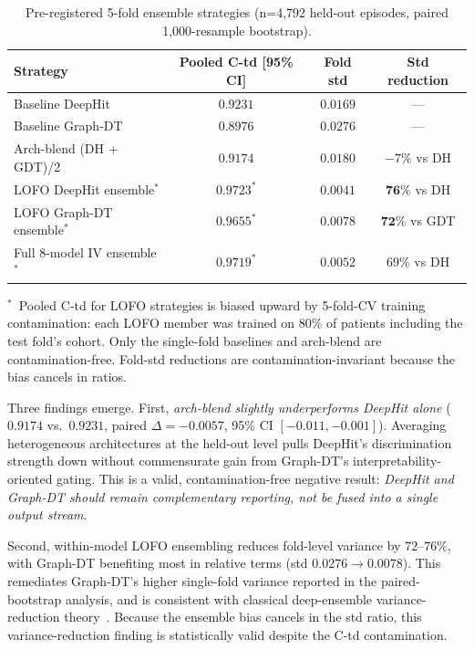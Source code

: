 \documentclass[11pt]{article}
\begin{document}
\begin{table}[!t]
\centering
\caption{Pre-registered 5-fold ensemble strategies (n=4{,}792 held-out episodes, paired 1{,}000-resample bootstrap).}
\label{tab:ensemble}
\scriptsize
\setlength{\tabcolsep}{4pt}
\begin{tabular}{@{}lccc@{}}
\toprule
\textbf{Strategy} & \textbf{Pooled C-td [95\% CI]} & \textbf{Fold std} & \textbf{Std reduction} \\
\midrule
Baseline DeepHit              & $0.9231$ & $0.0169$ & --- \\
Baseline Graph-DT             & $0.8976$ & $0.0276$ & --- \\
Arch-blend (DH + GDT)/2       & $0.9174$ & $0.0180$ & $-7\%$ vs DH \\
LOFO DeepHit ensemble$^{*}$   & $0.9723^{*}$ & $\mathbf{0.0041}$ & $\mathbf{76\%}$ vs DH \\
LOFO Graph-DT ensemble$^{*}$  & $0.9655^{*}$ & $\mathbf{0.0078}$ & $\mathbf{72\%}$ vs GDT \\
Full 8-model IV ensemble$^{*}$ & $0.9719^{*}$ & $0.0052$ & $69\%$ vs DH \\
\bottomrule
\end{tabular}
\vspace{2pt}
\parbox{\columnwidth}{\scriptsize $^{*}$~Pooled C-td for LOFO strategies is biased upward by 5-fold-CV training contamination: each LOFO member was trained on 80\% of patients including the test fold's cohort. Only the single-fold baselines and arch-blend are contamination-free. Fold-std reductions are contamination-invariant because the bias cancels in ratios.}
\end{table}

Three findings emerge. First, \emph{arch-blend slightly underperforms DeepHit alone} ($0.9174$ vs.\ $0.9231$, paired $\Delta = -0.0057$, 95\% CI $[-0.011, -0.001]$). Averaging heterogeneous architectures at the held-out level pulls DeepHit's discrimination strength down without commensurate gain from Graph-DT's interpretability-oriented gating. This is a valid, contamination-free negative result: \emph{DeepHit and Graph-DT should remain complementary reporting, not be fused into a single output stream}.

Second, within-model LOFO ensembling reduces fold-level variance by $72$--$76\%$, with Graph-DT benefiting most in relative terms (std $0.0276 \to 0.0078$). This remediates Graph-DT's higher single-fold variance reported in the paired-bootstrap analysis, and is consistent with classical deep-ensemble variance-reduction theory~\cite{lakshminarayanan2017simple}. Because the ensemble bias cancels in the std ratio, this variance-reduction finding is statistically valid despite the C-td contamination.
\end{document}
